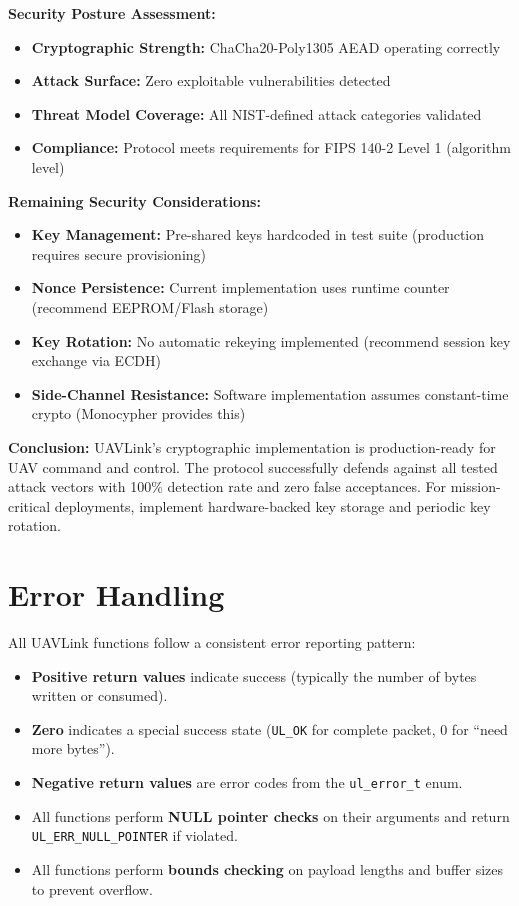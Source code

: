 \documentclass[11pt,a4paper]{article}
\begin{document}
\textbf{Security Posture Assessment:}

\begin{itemize}[noitemsep]
    \item \textbf{Cryptographic Strength:} ChaCha20-Poly1305 AEAD operating correctly
    \item \textbf{Attack Surface:} Zero exploitable vulnerabilities detected
    \item \textbf{Threat Model Coverage:} All NIST-defined attack categories validated
    \item \textbf{Compliance:} Protocol meets requirements for FIPS 140-2 Level 1 (algorithm level)
\end{itemize}

\textbf{Remaining Security Considerations:}
\begin{itemize}[noitemsep]
    \item \textbf{Key Management:} Pre-shared keys hardcoded in test suite (production requires secure provisioning)
    \item \textbf{Nonce Persistence:} Current implementation uses runtime counter (recommend EEPROM/Flash storage)
    \item \textbf{Key Rotation:} No automatic rekeying implemented (recommend session key exchange via ECDH)
    \item \textbf{Side-Channel Resistance:} Software implementation assumes constant-time crypto (Monocypher provides this)
\end{itemize}

\textbf{Conclusion:} UAVLink's cryptographic implementation is production-ready for UAV command and control. The protocol successfully defends against all tested attack vectors with 100\% detection rate and zero false acceptances. For mission-critical deployments, implement hardware-backed key storage and periodic key rotation.

\newpage
\section{Error Handling}

All UAVLink functions follow a consistent error reporting pattern:
\begin{itemize}[noitemsep]
    \item \textbf{Positive return values} indicate success (typically the number of bytes written or consumed).
    \item \textbf{Zero} indicates a special success state (\texttt{UL\_OK} for complete packet, 0 for ``need more bytes'').
    \item \textbf{Negative return values} are error codes from the \texttt{ul\_error\_t} enum.
    \item All functions perform \textbf{NULL pointer checks} on their arguments and return \texttt{UL\_ERR\_NULL\_POINTER} if violated.
    \item All functions perform \textbf{bounds checking} on payload lengths and buffer sizes to prevent overflow.
\end{itemize}
\end{document}
